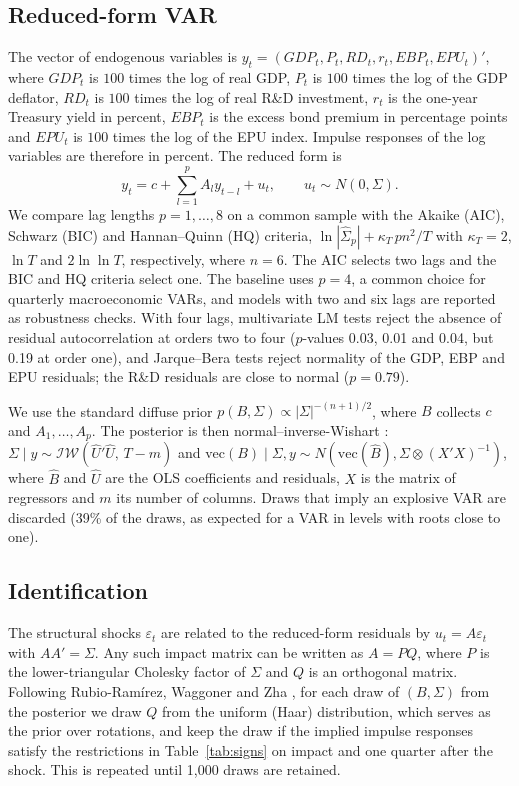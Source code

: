 \documentclass[conference]{IEEEtran}
\begin{document}
\subsection{Reduced-form VAR}
The vector of endogenous variables is
$y_t=(\mathit{GDP}_t, P_t, \mathit{RD}_t, r_t, \mathit{EBP}_t, \mathit{EPU}_t)'$,
where $\mathit{GDP}_t$ is $100$ times the log of real GDP, $P_t$ is $100$ times
the log of the GDP deflator, $\mathit{RD}_t$ is $100$ times the log of real R\&D
investment, $r_t$ is the one-year Treasury yield in percent, $\mathit{EBP}_t$
is the excess bond premium in percentage points and $\mathit{EPU}_t$ is $100$
times the log of the EPU index. Impulse responses of the log variables are
therefore in percent. The reduced form is
\begin{equation}
y_t=c+\sum_{l=1}^{p}A_l y_{t-l}+u_t,\qquad u_t\sim N(0,\Sigma).
\label{eq:var}
\end{equation}
We compare lag lengths $p=1,\dots,8$ on a common sample with the Akaike (AIC),
Schwarz (BIC) and Hannan--Quinn (HQ) criteria,
$\ln|\hat\Sigma_p|+\kappa_T\,pn^2/T$ with $\kappa_T=2$, $\ln T$ and
$2\ln\ln T$, respectively, where $n=6$. The AIC selects two lags and the BIC and
HQ criteria select one. The baseline uses $p=4$, a common choice for
quarterly macroeconomic VARs, and models with two and six lags are reported as
robustness checks. With four lags, multivariate LM tests reject the absence of residual
autocorrelation at orders two to four ($p$-values 0.03, 0.01 and 0.04, but 0.19
at order one), and Jarque--Bera tests reject normality of the GDP, EBP and EPU
residuals; the R\&D residuals are close to normal ($p=0.79$).

We use the standard diffuse prior $p(B,\Sigma)\propto|\Sigma|^{-(n+1)/2}$,
where $B$ collects $c$ and $A_1,\dots,A_p$. The posterior is then
normal--inverse-Wishart \cite{uhlig2005,kilian2017}: $\Sigma\mid y \sim
\mathcal{IW}(\hat U'\hat U,\,T-m)$ and
$\mathrm{vec}(B)\mid\Sigma,y\sim N(\mathrm{vec}(\hat B),\Sigma\otimes(X'X)^{-1})$,
where $\hat B$ and $\hat U$ are the OLS coefficients and residuals, $X$ is the
matrix of regressors and $m$ its number of columns. Draws that imply an
explosive VAR are discarded (39\% of the draws, as expected for a VAR in
levels with roots close to one).

\subsection{Identification}
The structural shocks $\varepsilon_t$ are related to the reduced-form
residuals by $u_t=A\varepsilon_t$ with $AA'=\Sigma$. Any such impact matrix
can be written as $A=PQ$, where $P$ is the lower-triangular Cholesky factor
of $\Sigma$ and $Q$ is an orthogonal matrix. Following Rubio-Ram\'irez,
Waggoner and Zha \cite{rubio2010}, for each draw of $(B,\Sigma)$ from the
posterior we draw $Q$ from the uniform (Haar) distribution, which serves as
the prior over rotations, and keep the draw if the implied impulse responses
satisfy the restrictions in Table~\ref{tab:signs} on impact and one quarter
after the shock. This is repeated until 1{,}000 draws are retained.
\end{document}
